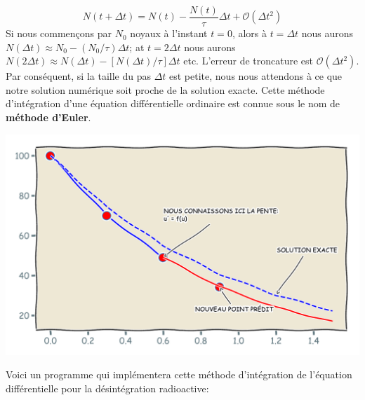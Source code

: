 \documentclass[%
oneside,                 %
final,                   %
10pt]{article}
\begin{document}
\begin{equation}
N(t + \Delta t) = N(t) - \frac{N(t)}{\tau} \Delta t + \mathcal{O}(\Delta t^2)
\label{eq:desintegration_euler}
\end{equation}
Si nous commençons par $N_0$ noyaux à l'instant $t = 0$, alors à $t = \Delta t$ nous aurons $N(\Delta t) \approx N_0 - (N_0/ \tau) \Delta t$; at $t = 2 \Delta t$ nous aurons $N(2\Delta t) \approx N(\Delta t) - [N(\Delta t)/ \tau] \Delta t$ etc.
L'erreur de troncature est $\mathcal{O}(\Delta t^2)$. Par conséquent, si la taille du pas $\Delta t$ est petite, nous nous attendons à ce que notre solution numérique soit proche de la solution exacte. Cette méthode d’intégration d’une équation différentielle ordinaire est connue sous le nom de \textbf{méthode d’Euler}.



\vspace{6mm}

\centerline{\includegraphics[width=0.7\linewidth]{scripts/euler_schema.pdf}}

\vspace{6mm}



Voici un programme qui implémentera cette méthode d'intégration de l'équation différentielle pour la désintégration radioactive:
\end{document}
